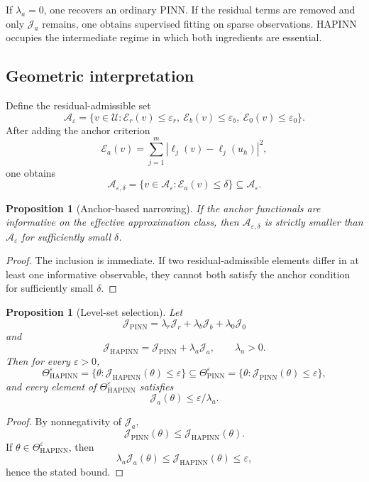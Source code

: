 \documentclass[preprint,12pt]{elsarticle}
\newtheorem{proposition}[theorem]{Proposition}
\theoremstyle{definition}
\numberwithin{equation}{section}
\newcommand{\cU}{\mathcal{U}}
\newcommand{\cE}{\mathcal{E}}
\newcommand{\cJ}{\mathcal{J}}
\newcommand{\cA}{\mathcal{A}}
\newcommand{\eps}{\varepsilon}
\newcommand{\abs}[1]{\left\lvert #1 \right\rvert}
\begin{document}
If $\lambda_a=0$, one recovers an ordinary PINN. If the residual terms are removed and only $\cJ_a$ remains, one obtains supervised fitting on sparse observations. HAPINN occupies the intermediate regime in which both ingredients are essential.

\subsection{Geometric interpretation}

Define the residual-admissible set
\[
\cA_\eps=
\{v\in\cU:\cE_r(v)\le\eps_r,\ \cE_b(v)\le\eps_b,\ \cE_0(v)\le\eps_0\}.
\]
After adding the anchor criterion
\[
\cE_a(v)=\sum_{j=1}^{m}\abs{\ell_j(v)-\ell_j(u_h)}^2,
\]
one obtains
\[
\cA_{\eps,\delta}
=
\{v\in\cA_\eps:\cE_a(v)\le\delta\}\subseteq \cA_\eps.
\]

\begin{proposition}[Anchor-based narrowing]
\label{prop:geom}
If the anchor functionals are informative on the effective approximation class, then $\cA_{\eps,\delta}$ is strictly smaller than $\cA_\eps$ for sufficiently small $\delta$.
\end{proposition}

\begin{proof}
The inclusion is immediate. If two residual-admissible elements differ in at least one informative observable, they cannot both satisfy the anchor condition for sufficiently small $\delta$.
\end{proof}

\begin{proposition}[Level-set selection]
\label{prop:branch}
Let
\[
\mathcal{J}_{\mathrm{PINN}}=\lambda_r\mathcal{J}_r+\lambda_b\mathcal{J}_b+\lambda_0\mathcal{J}_0
\]
and
\[
\mathcal{J}_{\mathrm{HAPINN}}
=
\mathcal{J}_{\mathrm{PINN}}+\lambda_a\mathcal{J}_a,
\qquad \lambda_a>0.
\]
Then for every $\eps>0$,
\[
\Theta_{\mathrm{HAPINN}}^\eps
=
\{\theta:\mathcal{J}_{\mathrm{HAPINN}}(\theta)\le \eps\}
\subseteq
\Theta_{\mathrm{PINN}}^\eps
=
\{\theta:\mathcal{J}_{\mathrm{PINN}}(\theta)\le \eps\},
\]
and every element of $\Theta_{\mathrm{HAPINN}}^\eps$ satisfies
\[
\mathcal{J}_a(\theta)\le \eps/\lambda_a.
\]
\end{proposition}

\begin{proof}
By nonnegativity of $\mathcal{J}_a$,
\[
\mathcal{J}_{\mathrm{PINN}}(\theta)\le \mathcal{J}_{\mathrm{HAPINN}}(\theta).
\]
If $\theta\in\Theta_{\mathrm{HAPINN}}^\eps$, then
\[
\lambda_a \mathcal{J}_a(\theta)\le \mathcal{J}_{\mathrm{HAPINN}}(\theta)\le \eps,
\]
hence the stated bound.
\end{proof}
\end{document}
